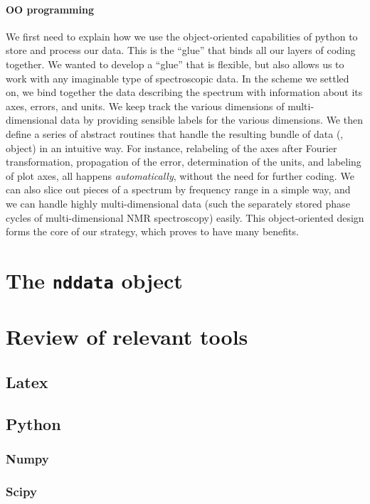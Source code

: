 \paragraph{OO programming}
We first need to explain 
    how we use the object-oriented capabilities of python
    to store and process our data.
This is the ``glue'' that binds all our layers of coding together.
We wanted to develop a ``glue'' that is flexible,
    but also allows us to work with any imaginable type
    of spectroscopic data.
In the scheme we settled on,
    we bind together the data describing the spectrum
    with information about its axes, errors, and units.
We keep track the various dimensions of multi-dimensional data
    by providing sensible labels for the various dimensions.
We then define a series of abstract routines that handle the resulting
    bundle of data (\ie, object) in an intuitive way.
For instance, relabeling of the axes after Fourier transformation,
    propagation of the error,
    determination of the units,
    and labeling of plot axes,
    all happens {\it automatically},
    without the need for further coding.
We can also slice out pieces of a spectrum by frequency range in a simple way,
    and we can handle highly multi-dimensional data
    (such the separately stored phase cycles of multi-dimensional NMR spectroscopy)
    easily.
This object-oriented design forms the core of our strategy,
    which proves to have many benefits.
\section{The \texttt{nddata} object}

\section{Review of relevant tools}
\subsection{Latex}
\subsection{Python}
\subsubsection{Numpy}
\subsubsection{Scipy}

